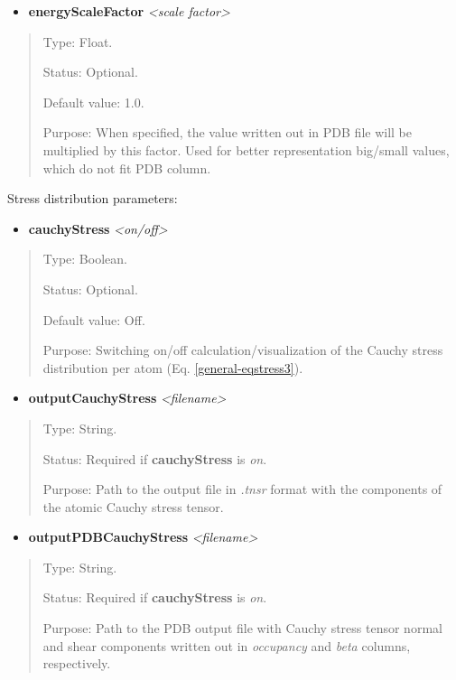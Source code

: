\documentclass[letterpaper,10pt,english]{sphinxmanual}
\begin{document}
\begin{itemize}
\item {} 
\textbf{energyScaleFactor} \emph{\textless{}scale factor\textgreater{}}

\end{itemize}
\begin{quote}

Type: Float.

Status: Optional.

Default value: 1.0.

Purpose: When specified, the value written out in PDB file will be multiplied by this factor. Used for better representation big/small values, which do not fit PDB column.
\end{quote}

Stress distribution parameters:
\begin{itemize}
\item {} 
\textbf{cauchyStress} \emph{\textless{}on/off\textgreater{}}

\end{itemize}
\begin{quote}

Type: Boolean.

Status: Optional.

Default value: Off.

Purpose: Switching on/off calculation/visualization of the Cauchy stress distribution per atom (Eq. \eqref{general-eqstress3}).
\end{quote}
\begin{itemize}
\item {} 
\textbf{outputCauchyStress} \emph{\textless{}filename\textgreater{}}

\end{itemize}
\begin{quote}

Type: String.

Status: Required if \textbf{cauchyStress} is \emph{on}.

Purpose:  Path to the output file in \emph{.tnsr} format with the components of the atomic Cauchy stress tensor.
\end{quote}
\begin{itemize}
\item {} 
\textbf{outputPDBCauchyStress} \emph{\textless{}filename\textgreater{}}

\end{itemize}
\begin{quote}

Type: String.

Status: Required if \textbf{cauchyStress} is \emph{on}.

Purpose:  Path to the PDB output file with Cauchy stress tensor normal and shear components written out in \emph{occupancy} and \emph{beta} columns, respectively.
\end{quote}
\end{document}
